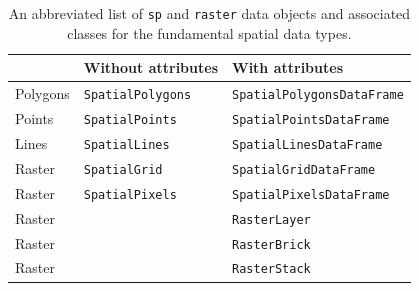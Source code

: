\documentclass[12pt,oneside]{book}\usepackage[]{graphicx}\usepackage[]{color}
\begin{document}
\begin{table}[!ht]
\centering
\begin{tabular}{lll}
\hline
 & Without attributes & With attributes\\ \hline
Polygons & 	\verb+SpatialPolygons+ & 	\verb+SpatialPolygonsDataFrame+\\
Points & 	\verb+SpatialPoints+ & 	\verb+SpatialPointsDataFrame+\\
Lines & 	\verb+SpatialLines+ & 	\verb+SpatialLinesDataFrame+\\
Raster & 	\verb+SpatialGrid+ & 	\verb+SpatialGridDataFrame+\\
Raster & 	\verb+SpatialPixels+ & 	\verb+SpatialPixelsDataFrame+\\
Raster & 	 & 	\verb+RasterLayer+\\
Raster & 	 & 	\verb+RasterBrick+\\
Raster & 	 & 	\verb+RasterStack+\\\hline
\end{tabular}
\caption{An abbreviated list of \texttt{sp} and \texttt{raster} data objects and associated classes for the fundamental spatial data types.}
\label{tab:spatialObjs}
\end{table}
\end{document}
